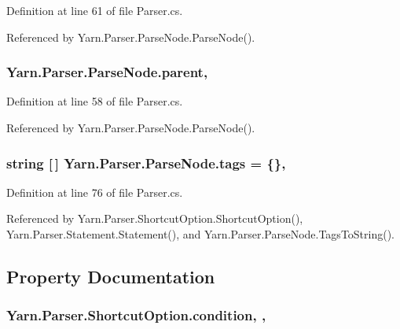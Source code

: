 Definition at line 61 of file Parser.\-cs.



Referenced by Yarn.\-Parser.\-Parse\-Node.\-Parse\-Node().

\hypertarget{a00138_af313a82103fcc2ff5a177dbb06b92f7b}{
\subsubsection[{parent}]{ Yarn.\-Parser.\-Parse\-Node.\-parent\hspace{0.3cm}{\ttfamily [package]}, {\ttfamily [inherited]}}}\label{a00138_af313a82103fcc2ff5a177dbb06b92f7b}


Definition at line 58 of file Parser.\-cs.



Referenced by Yarn.\-Parser.\-Parse\-Node.\-Parse\-Node().

\hypertarget{a00138_a58b3a15788fd2d4127d73619dc6d04ae}{
\subsubsection[{tags}]{\setlength{\rightskip}{0pt plus 5cm}string \mbox{[}$\,$\mbox{]} Yarn.\-Parser.\-Parse\-Node.\-tags = \{\}\hspace{0.3cm}{\ttfamily [package]}, {\ttfamily [inherited]}}}\label{a00138_a58b3a15788fd2d4127d73619dc6d04ae}


Definition at line 76 of file Parser.\-cs.



Referenced by Yarn.\-Parser.\-Shortcut\-Option.\-Shortcut\-Option(), Yarn.\-Parser.\-Statement.\-Statement(), and Yarn.\-Parser.\-Parse\-Node.\-Tags\-To\-String().



\subsection{Property Documentation}
\hypertarget{a00149_a31ece7f65af1e43961b68ba0275cdfaf}{
\subsubsection[{condition}]{ Yarn.\-Parser.\-Shortcut\-Option.\-condition\hspace{0.3cm}{\ttfamily [get]}, {\ttfamily [set]}, {\ttfamily [package]}}}\label{a00149_a31ece7f65af1e43961b68ba0275cdfaf}


